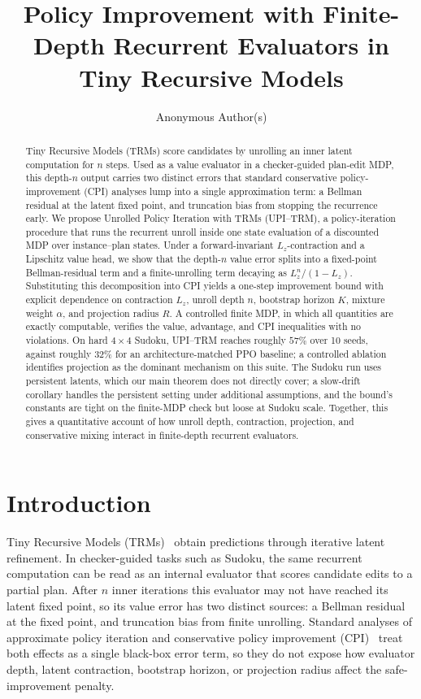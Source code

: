 \documentclass{article}
\title{Policy Improvement with Finite-Depth Recurrent Evaluators in Tiny Recursive Models}
\author{%
  Anonymous Author(s)
}
\theoremstyle{plain}
\theoremstyle{definition}
\theoremstyle{remark}
\begin{document}
\maketitle
\begin{abstract}
Tiny Recursive Models (TRMs) score candidates by unrolling an inner latent computation for $n$ steps. Used as a value evaluator in a checker-guided plan-edit MDP, this depth-$n$ output carries two distinct errors that standard conservative policy-improvement (CPI) analyses lump into a single approximation term: a Bellman residual at the latent fixed point, and truncation bias from stopping the recurrence early. We propose Unrolled Policy Iteration with TRMs (UPI--TRM), a policy-iteration procedure that runs the recurrent unroll inside one state evaluation of a discounted MDP over instance--plan states. Under a forward-invariant $L_z$-contraction and a Lipschitz value head, we show that the depth-$n$ value error splits into a fixed-point Bellman-residual term and a finite-unrolling term decaying as $L_z^n/(1-L_z)$. Substituting this decomposition into CPI yields a one-step improvement bound with explicit dependence on contraction $L_z$, unroll depth $n$, bootstrap horizon $K$, mixture weight $\alpha$, and projection radius $R$. A controlled finite MDP, in which all quantities are exactly computable, verifies the value, advantage, and CPI inequalities with no violations. On hard $4\times 4$ Sudoku, UPI--TRM reaches roughly $57\%$ over 10 seeds, against roughly $32\%$ for an architecture-matched PPO baseline; a controlled ablation identifies projection as the dominant mechanism on this suite. The Sudoku run uses persistent latents, which our main theorem does not directly cover; a slow-drift corollary handles the persistent setting under additional assumptions, and the bound's constants are tight on the finite-MDP check but loose at Sudoku scale. Together, this gives a quantitative account of how unroll depth, contraction, projection, and conservative mixing interact in finite-depth recurrent evaluators.
\end{abstract}

\section{Introduction}
\label{sec:intro}

Tiny Recursive Models (TRMs)~\citep{TRM2025} obtain predictions through iterative latent refinement. In checker-guided tasks such as Sudoku, the same recurrent computation can be read as an internal evaluator that scores candidate edits to a partial plan. After $n$ inner iterations this evaluator may not have reached its latent fixed point, so its value error has two distinct sources: a Bellman residual at the fixed point, and truncation bias from finite unrolling. Standard analyses of approximate policy iteration and conservative policy improvement (CPI)~\citep{BertsekasTsitsiklis1996,KakadeLangford2002} treat both effects as a single black-box error term, so they do not expose how evaluator depth, latent contraction, bootstrap horizon, or projection radius affect the safe-improvement penalty.
\end{document}
